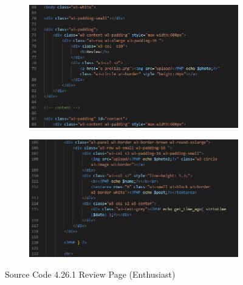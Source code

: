\begin{enumerate}[1.]
\begin{figure}[h]
\begin{subfigure}[b]{0.9\textwidth}
            \includegraphics[width=\textwidth]{mainmatter/images/frontend/code/ereview.png}
            \label{fig:sub1}
        \end{subfigure}
        \hspace{0.04\textwidth}
        \begin{subfigure}[b]{0.9\textwidth}
            \centering
            \includegraphics[width=\textwidth]{mainmatter/images/frontend/code/ereview2.png}
            \label{fig:sub2}
        \end{subfigure}
        \caption*{Source Code 4.26.1 Review Page (Enthusiast)}
        \label{fig:myfig65a}
    \end{figure}
    \clearpage
    \begin{figure}[h]\ContinuedFloat
        \centering
        \begin{subfigure}[b]{0.8\textwidth}
            \centering

\end{subfigure}
\end{figure}
\end{enumerate}
